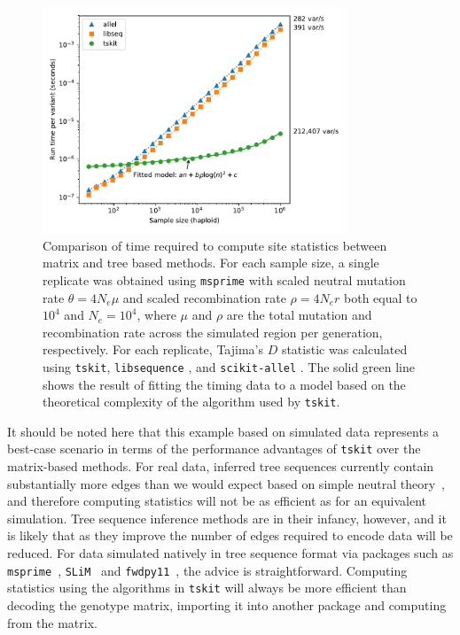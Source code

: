 \documentclass{article}
\newcommand{\tskit}{{\texttt{tskit}}}
\begin{document}
\begin{figure}
    \centering
    \includegraphics[width=9cm]{tskit_stat_benchmarks/benchmarks_without_copy_longer_genome.pdf}
    \caption{Comparison of time required to compute site statistics
        between matrix and tree based methods. For each sample size, a single replicate
        was obtained using \texttt{msprime} with scaled neutral mutation rate $\theta = 4N_e\mu$ and
        scaled recombination rate $\rho = 4N_er$ both equal to $10^4$ and $N_e = 10^4$,
        where $\mu$ and $\rho$ are the total mutation and recombination rate across the simulated region
        per generation, respectively.
        For each replicate, Tajima's $D$
        \citep{Tajima1989-de} statistic was calculated using \tskit, \texttt{libsequence}
        \citep{Thornton2003-wj}, and \texttt{scikit-allel} \citep{miles2017scikit}.
        The solid green line shows the result of fitting the timing data to a model
        based on the theoretical complexity of the algorithm used by \texttt{tskit}.
        \label{fig:stats_performance}
    }
\end{figure}

It should be noted here that this example based on simulated data
represents a best-case scenario in terms of the performance advantages
of \tskit{} over the matrix-based methods. For real data, inferred
tree sequences currently contain substantially more edges than we
would expect based on simple neutral theory~\citep{kelleher2019inferring},
and therefore computing statistics will not be as efficient as
for an equivalent simulation. Tree sequence inference
methods are in their infancy, however, and it is likely that
as they improve the number of edges required to encode data will
be reduced. For data simulated natively in tree sequence format
via packages such as \texttt{msprime}~\citep{kelleher2016efficient},
\texttt{SLiM}~\citep{haller2018tree,haller2019slim} and
\texttt{fwdpy11}~\citep{thornton2014c++}, the advice is straightforward.
Computing statistics using the algorithms in \tskit{}
will always be more efficient than decoding the genotype
matrix, importing it into another package and computing from the matrix.
\end{document}

